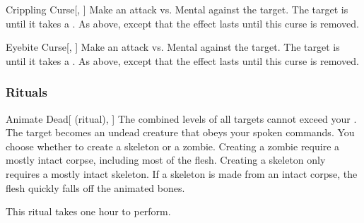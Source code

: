 \lowercase{\hypertarget{spell:Crippling Curse}{}}\label{spell:Crippling Curse}
\begin{freeability}[Rank 8]{\hypertarget{spell:Crippling Curse}{Crippling Curse}}[, ]
Make an attack vs. Mental against the target.
\hit The target is  until it takes a .
\crit As above, except that the effect lasts until this curse is removed.
\end{freeability}
\vspace{0.25em}



\lowercase{\hypertarget{spell:Eyebite Curse}{}}\label{spell:Eyebite Curse}
\begin{freeability}[Rank 8]{\hypertarget{spell:Eyebite Curse}{Eyebite Curse}}[, ]
Make an attack vs. Mental against the target.
\hit The target is  until it takes a .
\crit As above, except that the effect lasts until this curse is removed.
\end{freeability}
\vspace{0.25em}



\subsubsection{Rituals}


\lowercase{\hypertarget{spell:Animate Dead}{}}\label{spell:Animate Dead}
\begin{attuneability}[Rank 3]{\hypertarget{spell:Animate Dead}{Animate Dead}}[ (ritual), ]
The combined levels of all targets cannot exceed your .
The target becomes an undead creature that obeys your spoken commands.
You choose whether to create a skeleton or a zombie.
Creating a zombie require a mostly intact corpse, including most of the flesh.
Creating a skeleton only requires a mostly intact skeleton.
If a skeleton is made from an intact corpse, the flesh quickly falls off the animated bones.

This ritual takes one hour to perform.
\end{attuneability}
\vspace{0.25em}



